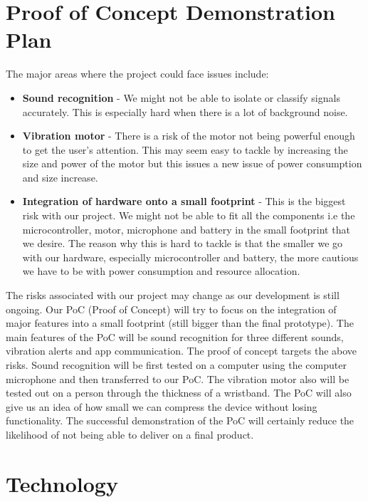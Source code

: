 \documentclass{article}
\begin{document}
\section{Proof of Concept Demonstration Plan}

The major areas where the project could face issues include: 
\begin{itemize}
	\item \textbf{Sound recognition} - We might not be able to isolate or classify signals accurately. This is especially hard when there is a lot of background noise. 
	\item \textbf{Vibration motor} - There is a risk of the motor not being powerful enough to get the user’s attention. This may seem easy to tackle by increasing the size and power of the motor but this issues a new issue of power consumption and size increase.
	\item \textbf{Integration of hardware onto a small footprint} - This is the biggest risk with our project. We might not be able to fit all the components i.e the microcontroller, motor, microphone and battery in the small footprint that we desire. The reason why this is hard to tackle is that the smaller we go with our hardware, especially microcontroller and battery, the more cautious we have to be with power consumption and resource allocation. 
\end{itemize} 
The risks associated with our project may change as our development is still ongoing. 
Our PoC (Proof of Concept) will try to focus on the integration of major features into a small footprint (still bigger than the final prototype). The main features of the PoC will be sound recognition for three different sounds, vibration alerts and app communication. The proof of concept targets the above risks. Sound recognition will be first tested on a computer using the computer microphone and then transferred to our PoC. The vibration motor also will be tested out on a person through the thickness of a wristband. The PoC will also give us an idea of how small we can compress the device without losing functionality. The successful demonstration of the PoC will certainly reduce the likelihood of not being able to deliver on a final product.


\section{Technology}
\end{document}

